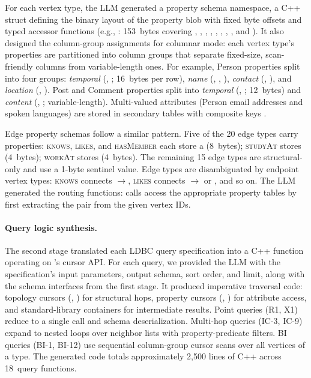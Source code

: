 For each vertex type, the LLM generated a property schema namespace, a C++ struct defining the binary layout of the property blob with fixed byte offsets and typed accessor functions (e.g., : 153~bytes covering , , , , , , , , and ).
It also designed the \wt{} column-group assignments for columnar mode: each vertex type's properties are partitioned into column groups that separate fixed-size, scan-friendly columns from variable-length ones.
For example, Person properties split into four groups: \emph{temporal} (, ; 16~bytes per row), \emph{name} (, , ), \emph{contact} (, ), and \emph{location} (, ).
Post and Comment properties split into \emph{temporal} (, ; 12~bytes) and \emph{content} (, ; variable-length).
Multi-valued attributes (Person email addresses and spoken languages) are stored in secondary \wt{} tables with composite keys .

Edge property schemas follow a similar pattern.
Five of the 20 edge types carry properties: \textsc{knows}, \textsc{likes}, and \textsc{hasMember} each store a  (8~bytes); \textsc{studyAt} stores  (4~bytes); \textsc{workAt} stores  (4~bytes).
The remaining 15 edge types are structural-only and use a 1-byte sentinel value.
Edge types are disambiguated by endpoint vertex types: \textsc{knows} connects $\to$, \textsc{likes} connects $\to$ or , and so on.
The LLM generated the routing functions:  calls access the appropriate property tables by first extracting the  pair from the given vertex IDs.

\paragraph{Query logic synthesis.}
The second stage translated each LDBC query specification into a C++ function operating on \project{}'s cursor API.
For each query, we provided the LLM with the specification's input parameters, output schema, sort order, and limit, along with the schema interfaces from the first stage.
It produced imperative traversal code: topology cursors (, ) for structural hops, property cursors (, ) for attribute access, and standard-library containers for intermediate results.
Point queries (R1, X1) reduce to a single  call and schema deserialization.
Multi-hop queries (IC-3, IC-9) expand to nested loops over neighbor lists with property-predicate filters.
BI queries (BI-1, BI-12) use sequential column-group cursor scans over all vertices of a type.
The generated code totals approximately 2{,}500 lines of C++ across 18~query functions.

